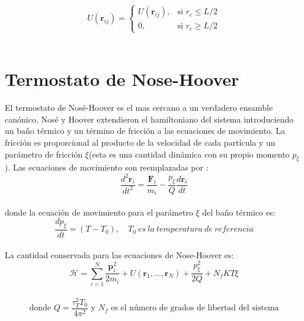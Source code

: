 \begin{equation}\label{MIC}
    U(\mathbf{r}_{ij}) =
    \begin{cases} 
    U(\mathbf{r}_{ij}),& \text{si } r_c\leq L/2\\
    0,& \text{si } r_c\geq L/2
    \end{cases}
\end{equation}\\

\section{Termostato de Nose-Hoover}

El termostato de Nosé-Hoover es el mas cercano a un verdadero ensamble canónico, Nosé y Hoover extendieron el hamiltoniano del sistema introduciendo un baño térmico y un término de fricción a las ecuaciones de movimiento. La fricción es proporcional al producto de la velocidad de cada partícula y un parámetro de fricción $\xi$(esta es una cantidad dinámica con su propio momento $p_\xi$). Las ecuaciones de movimiento son reemplazadas por \cite{evans1985} \cite{gromacsdoc}:\\

\begin{equation} \label{NHmotion}
    \frac{d^2\mathbf{r}_i}{dt^2} = \frac{\mathbf{F}_i}{m_i}-\frac{p_\xi}{Q}\frac{d\mathbf{r}_i}{dt}
\end{equation}\\

donde la ecuación de movimiento para el parámetro $\xi$ del baño térmico es:\\

\begin{equation}
    \frac{dp_\xi}{dt}=(T-T_0),\quad T_0\ es\ la\ temperatura\ de\ referencia
\end{equation}\\

La cantidad conservada para las ecuaciones de Nose-Hoover es:\\

\begin{equation} \label{conservedNoseHoover}
    \mathcal{H} = \sum_{i=1}^{N}\frac{\mathbf{p}_i^2}{2m_i} + U(\mathbf{r}_1,...,\mathbf{r}_N)+\frac{p_\xi^2}{2Q} + N_fKT\xi
\end{equation}\\

\begin{equation*} \label{taut}
    \text{donde }Q=\frac{\tau_T^2 T_0}{4\pi^2} \text{ y $N_f$ es el número de grados de libertad del sistema}
\end{equation*}\\

